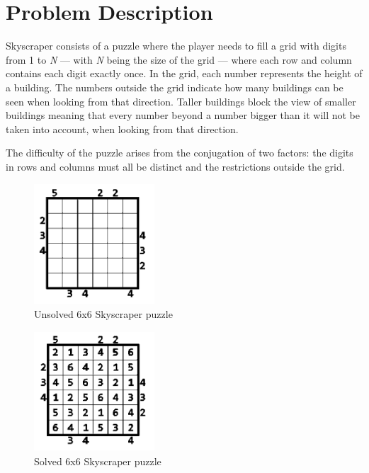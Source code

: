 \documentclass{llncs}
\begin{document}
%
\section{Problem Description}
%
Skyscraper consists of a puzzle where the player needs to fill a grid with digits from 1 to \textit{N} --- with \textit{N} being the size of the grid --- where each row and column contains each digit exactly once. In the grid, each number represents the height of a building. The numbers outside the grid indicate how many buildings can be seen when looking from that direction. Taller buildings block the view of smaller buildings meaning that every number beyond a number bigger than it will not be taken into account, when looking from that direction.

The difficulty of the puzzle arises from the conjugation of two factors: the digits in rows and columns must all be distinct and the restrictions outside the grid.

\begin{figure}[h!]
\begin{center}
\includegraphics[height=4.5cm,width=4.5cm]{images/skyscraper_unsolved.png}
\caption{Unsolved 6x6 Skyscraper puzzle}
\label{Figure 1}
\end{center}
\end{figure}

\begin{figure}[h!]
\begin{center}
\includegraphics[height=4.5cm,width=4.5cm]{images/skyscraper_solved.png}
\caption{Solved 6x6 Skyscraper puzzle}
\label{Figure 2}
\end{center}
\end{figure}
\end{document}
